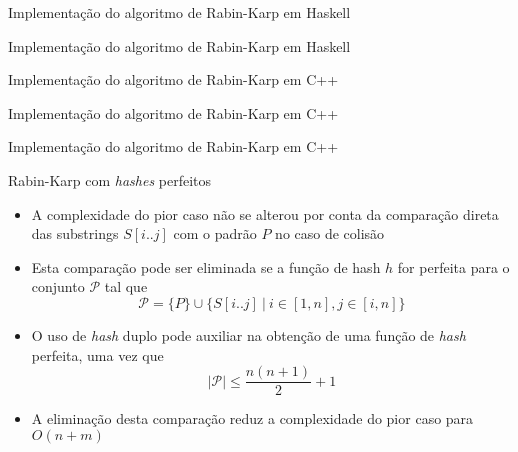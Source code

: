 \begin{frame}[fragile]{Implementação do algoritmo de Rabin-Karp em Haskell}
\end{frame}

\begin{frame}[fragile]{Implementação do algoritmo de Rabin-Karp em Haskell}
\end{frame}

\begin{frame}[fragile]{Implementação do algoritmo de Rabin-Karp em C++}
\end{frame}

\begin{frame}[fragile]{Implementação do algoritmo de Rabin-Karp em C++}
\end{frame}

\begin{frame}[fragile]{Implementação do algoritmo de Rabin-Karp em C++}
\end{frame}


\begin{frame}[fragile]{Rabin-Karp com {\it hashes} perfeitos}

    \begin{itemize}
        \item A complexidade do pior caso não se alterou por conta da comparação direta das
            substrings $S[i..j]$ com o padrão $P$ no caso de colisão
        \pause

        \item Esta comparação pode ser eliminada se a função de hash $h$ for perfeita para 
            o conjunto $\mathcal{P}$ tal que
        \[
            \mathcal{P} = \lbrace P \rbrace \cup \lbrace S[i..j]\ |\ i\in [1,n], j\in [i,n]\rbrace
        \]
        \pause

        \item O uso de \textit{hash} duplo pode auxiliar na obtenção de uma função de
            \textit{hash} perfeita, uma vez que
            \[
                |\mathcal{P}| \leq \dfrac{n(n + 1)}{2} + 1
            \]
        \pause
 
        \item A eliminação desta comparação reduz a complexidade do pior caso para 
            $O(n + m)$
    \end{itemize}

\end{frame}

